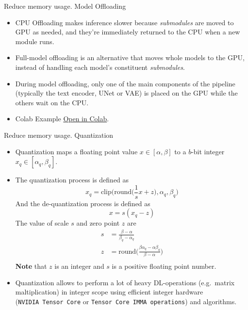 \documentclass[
  9pt,
  ignorenonframetext,
  aspectratio=169,
]{beamer}
\begin{document}
\begin{frame}{Reduce memory usage. Model Offloading}
\label{reduce-memory-usage.-model-offloading}
\begin{itemize}
\item
  CPU Offloading makes inference slower because \emph{submodules} are
  moved to GPU as needed, and they're immediately returned to the CPU
  when a new module runs.
\item
  Full-model offloading is an alternative that moves whole models to the
  GPU, instead of handling each model's constituent \emph{submodules}.
\item
  During model offloading, only one of the main components of the
  pipeline (typically the text encoder, UNet or VAE) is placed on the
  GPU while the others wait on the CPU.
\item
  Colab Example
  \href{https://colab.research.google.com/drive/1Ugx3dUl_MHsYCAgz12qbuz_couJajpb6?usp=sharing}{\faPython Open
  in Colab}.
\end{itemize}
\end{frame}

\begin{frame}[fragile]{Reduce memory usage. Quantization}
\label{reduce-memory-usage.-quantization}
\begin{itemize}
\item
  Quantization maps a floating point value \(x \in [\alpha, \beta]\) to
  a \(b\)-bit integer \(x_q \in [\alpha_q, \beta_q]\).
\item
  The quantization process is defined as
  \[x_q = \text{clip}\Big( \text{round}\big(\frac{1}{s} x + z\big), \alpha_q, \beta_q \Big)\]
  And the de-quantization process is defined as \[x = s (x_q - z)\] The
  value of scale \(s\) and zero point \(z\) are \begin{align}
  s &= \frac{\beta - \alpha}{\beta_q - \alpha_q} \\
  z &= \text{round}\big(\frac{\beta \alpha_q - \alpha \beta_q}{\beta - \alpha}\big) \\
  \end{align} \textbf{Note} that \(z\) is an integer and \(s\) is a
  positive floating point number.
\item
  Quantization allows to perform a lot of heavy DL-operations
  (e.g.~matrix maltiplication) in integer scope using efficient integer
  hardware (\texttt{NVIDIA\ Tensor\ Core} or
  \texttt{Tensor\ Core\ IMMA\ operations}) and algorithms.
\end{itemize}
\end{frame}
\end{document}
